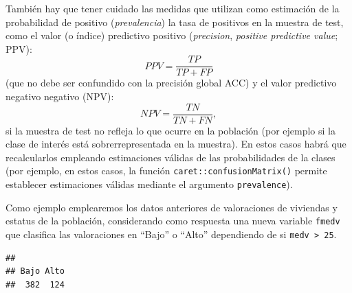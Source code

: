 \documentclass[]{book}
\newenvironment{Shaded}{\begin{snugshade}}{\end{snugshade}}
\newcommand{\KeywordTok}[1]{\textcolor[rgb]{0.13,0.29,0.53}{\textbf{#1}}}
\newcommand{\DataTypeTok}[1]{\textcolor[rgb]{0.13,0.29,0.53}{#1}}
\newcommand{\DecValTok}[1]{\textcolor[rgb]{0.00,0.00,0.81}{#1}}
\newcommand{\StringTok}[1]{\textcolor[rgb]{0.31,0.60,0.02}{#1}}
\newcommand{\CommentTok}[1]{\textcolor[rgb]{0.56,0.35,0.01}{\textit{#1}}}
\newcommand{\OtherTok}[1]{\textcolor[rgb]{0.56,0.35,0.01}{#1}}
\newcommand{\OperatorTok}[1]{\textcolor[rgb]{0.81,0.36,0.00}{\textbf{#1}}}
\newcommand{\NormalTok}[1]{#1}
\theoremstyle{break}
\theoremstyle{definition}
\theoremstyle{definition}
\theoremstyle{definition}
\theoremstyle{remark}
\begin{document}
También hay que tener cuidado las medidas que utilizan como estimación
de la probabilidad de positivo (\emph{prevalencia}) la tasa de positivos
en la muestra de test, como el valor (o índice) predictivo positivo
(\emph{precision}, \emph{positive predictive value}; PPV):
\[PPV = \frac{TP}{TP+FP}\] (que no debe ser confundido con la precisión
global ACC) y el valor predictivo negativo negativo (NPV):
\[NPV = \frac{TN}{TN+FN},\] si la muestra de test no refleja lo que
ocurre en la población (por ejemplo si la clase de interés está
sobrerrepresentada en la muestra). En estos casos habrá que
recalcularlos empleando estimaciones válidas de las probabilidades de la
clases (por ejemplo, en estos casos, la función
\texttt{caret::confusionMatrix()} permite establecer estimaciones
válidas mediante el argumento \texttt{prevalence}).

Como ejemplo emplearemos los datos anteriores de valoraciones de
viviendas y estatus de la población, considerando como respuesta una
nueva variable \texttt{fmedv} que clasifica las valoraciones en ``Bajo''
o ``Alto'' dependiendo de si \texttt{medv\ \textgreater{}\ 25}.

\begin{Shaded}
\end{Shaded}

\begin{verbatim}
## 
## Bajo Alto 
##  382  124
\end{verbatim}

\begin{Shaded}
\end{Shaded}
\end{document}
